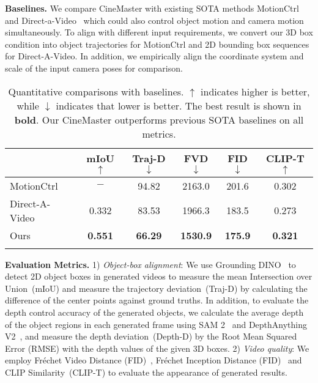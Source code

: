 \noindent\textbf{Baselines.} We compare CineMaster with existing SOTA methods MotionCtrl~\cite{MotionCtrl} and Direct-a-Video~\cite{yang2024direct} which could also control object motion and camera motion simultaneously. To align with different input requirements, we convert our 3D box condition into object trajectories for MotionCtrl and 2D bounding box sequences for Direct-A-Video. In addition, we empirically align the coordinate system and scale of the input camera poses for comparison.



\begin{table}[!t]
\centering
\caption{Quantitative comparisons with baselines. $\uparrow$ indicates higher is better, while $\downarrow$ indicates that lower is better. The best result is shown in \textbf{bold}. Our CineMaster outperforms previous SOTA baselines on all metrics.
 }
\vspace{-4pt}
\setlength{\tabcolsep}{1.5pt}
\label{tab:comparsion}
\begin{tabular}{lccccc}
\toprule
               & mIoU$\uparrow$           & Traj-D$\downarrow$        & FVD$\downarrow$               & FID$\downarrow$             & CLIP-T$\uparrow$              \\
\midrule                
MotionCtrl     & $-$          & 94.82          & 2163.0          & 201.6          & 0.302                    \\
Direct-A-Video & 0.332          & 83.53          & 1966.3          & 183.5          & 0.273                   \\
Ours           & \textbf{0.551} & \textbf{66.29} & \textbf{1530.9} & \textbf{175.9} & \textbf{0.321}  \\
\bottomrule
\vspace{-18pt}
\end{tabular}
\end{table}



\noindent\textbf{Evaluation Metrics.}
1) \textit{Object-box alignment}: We use Grounding DINO~\cite{groundingdino} to detect 2D object boxes in generated videos to measure the mean Intersection over Union~(mIoU) and measure the trajectory deviation~(Traj-D) by calculating the difference of the center points against ground truths. In addition, to evaluate the depth control accuracy of the generated objects, we calculate the average depth of the object regions in each generated frame using SAM 2~\cite{2024sam2segmentimages} and DepthAnything V2~\cite{depth_anything_v2}, and measure the depth deviation~(Depth-D) by the Root Mean Squared Error (RMSE) with the depth values of the given 3D boxes. 2) \textit{Video quality}: We employ Fréchet Video Distance (FID)~\cite{unterthiner2018towards}, Fréchet Inception Distance (FID)~\cite{lucic2017gans} and CLIP Similarity~(CLIP-T) to evaluate the appearance of generated results.




